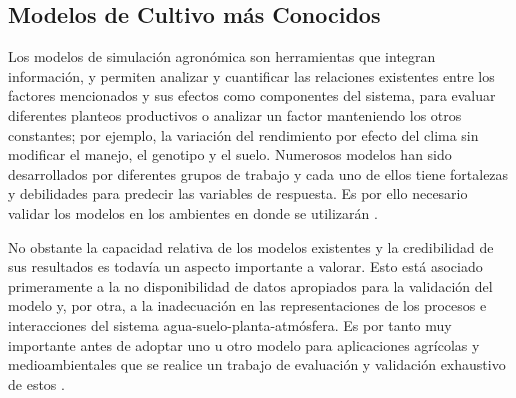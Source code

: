 \subsection{Modelos de Cultivo más Conocidos}

Los modelos de simulación agronómica son herramientas que integran información, y permiten analizar y cuantificar las relaciones existentes entre los factores mencionados y sus efectos como componentes del sistema, para evaluar diferentes planteos productivos o analizar un factor manteniendo los otros constantes; por ejemplo, la variación del rendimiento por efecto del clima sin modificar el manejo, el genotipo y el suelo. Numerosos modelos han sido desarrollados por diferentes grupos de trabajo y cada uno de ellos tiene fortalezas y debilidades para predecir las variables de respuesta. Es por ello necesario validar los modelos en los ambientes en donde se utilizarán \parencite{salvagiotti2003analisis}.

No obstante la capacidad relativa de los modelos existentes y la credibilidad de sus resultados es todavía un aspecto importante a valorar. Esto está asociado primeramente a la no disponibilidad de datos apropiados para la validación del modelo y, por otra, a la inadecuación en las representaciones de los procesos e interacciones del sistema agua-suelo-planta-atmósfera. Es por tanto muy importante antes de adoptar uno u otro modelo para aplicaciones agrícolas y medioambientales que se realice un trabajo de evaluación y validación exhaustivo de estos \parencite{lopez20143}.\\

